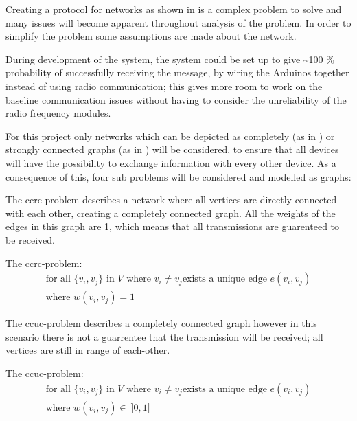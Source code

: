 Creating a protocol for networks as shown in  is a complex problem to solve and many issues will become apparent throughout analysis of the problem.
In order to simplify the problem some assumptions are made about the network.

During development of the system, the system could be set up to give \textasciitilde100 \% probability of successfully receiving the message, by wiring the Arduinos together instead of using radio communication; this gives more room to work on the baseline communication issues without having to consider the unreliability of the radio frequency modules.

For this project only networks which can be depicted as completely (as in ) or strongly connected graphs (as in ) will be considered, to ensure that all devices will have the possibility to exchange information with every other device.
As a consequence of this, four sub problems will be considered and modelled as graphs:

\bigskip

\noindent The \gls{ccrc}-problem describes a network where all vertices are directly connected with each other, creating a completely connected graph.
All the weights of the edges in this graph are 1, which means that all transmissions are guarenteed to be received. 	

\begin{definition}
	The \acrshort{ccrc}-problem:
	\begin{align*}
		\text{for all } \{v_i, v_j\} \text{ in } V \text{ where } v_i \neq v_j \text{exists a unique edge } e(v_i, v_j) \\
		\text{where } w(v_i, v_j) = 1
	\end{align*}
\end{definition}

\noindent The \gls{ccuc}-problem describes a completely connected graph however in this scenario there is not a guarrentee that the transmission will be received; all vertices are still in range of each-other.

\begin{definition}
	The \acrshort{ccuc}-problem:
	\begin{align*}
		\text{for all } \{v_i, v_j\} \text{ in } V \text{ where } v_i \neq v_j \text{exists a unique edge } e(v_i, v_j) \\
		\text{where } w(v_i, v_j) \in\ ]0, 1]
	\end{align*}
\end{definition} 

